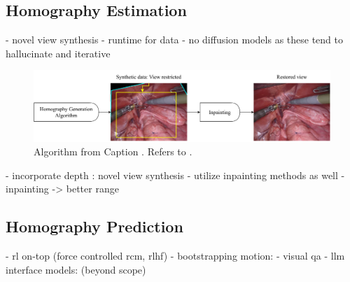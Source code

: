 \subsection{Homography Estimation}
\label{con:sec:hom_est}

- novel view synthesis
    - runtime for data
    - no diffusion models \cite{rombach2022high} as these tend to hallucinate and iterative  
\begin{figure}
    \centering
    \includegraphics[width=\textwidth]{conclusion/fig/fourier_inpainting.pdf}
    \caption{Algorithm from   Caption \cite{suvorov2021resolution}. Refers to .}
    \label{con:fig:inpainting}
\end{figure}
- incorporate depth \cite{budd2024transferring}: novel view synthesis
- utilize inpainting methods as well
- inpainting -> better range


\subsection{Homography Prediction}
\label{con:sec:hom_pred}


- rl on-top (force controlled rcm, rlhf)
- bootstrapping motion:
    - visual qa
- llm interface models:  (beyond scope)
